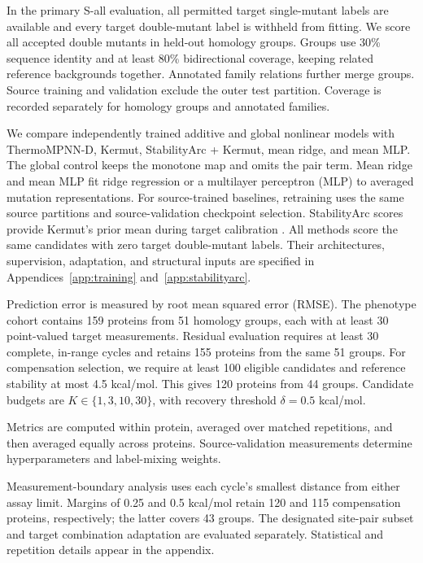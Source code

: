 \documentclass{llncs}
\begin{document}
In the primary S-all evaluation, all permitted target single-mutant labels are available and every target double-mutant label is withheld from fitting. We score all accepted double mutants in held-out homology groups. Groups use 30\% sequence identity and at least 80\% bidirectional coverage, keeping related reference backgrounds together. Annotated family relations further merge groups. Source training and validation exclude the outer test partition. Coverage is recorded separately for homology groups and annotated families.

We compare independently trained additive and global nonlinear models with ThermoMPNN-D, Kermut, StabilityArc + Kermut, mean ridge, and mean MLP. The global control keeps the monotone map and omits the pair term. Mean ridge and mean MLP fit ridge regression or a multilayer perceptron (MLP) to averaged mutation representations. For source-trained baselines, retraining uses the same source partitions and source-validation checkpoint selection. StabilityArc scores provide Kermut's prior mean during target calibration \citep{feller2026,groth2024}. All methods score the same candidates with zero target double-mutant labels. Their architectures, supervision, adaptation, and structural inputs are specified in Appendices~\ref{app:training} and~\ref{app:stabilityarc}.

Prediction error is measured by root mean squared error (RMSE). The phenotype cohort contains 159 proteins from 51 homology groups, each with at least 30 point-valued target measurements. Residual evaluation requires at least 30 complete, in-range cycles and retains 155 proteins from the same 51 groups. For compensation selection, we require at least 100 eligible candidates and reference stability at most 4.5 kcal/mol. This gives 120 proteins from 44 groups. Candidate budgets are $K\in\{1,3,10,30\}$, with recovery threshold $\delta=0.5$ kcal/mol.

Metrics are computed within protein, averaged over matched repetitions, and then averaged equally across proteins. Source-validation measurements determine hyperparameters and label-mixing weights.

Measurement-boundary analysis uses each cycle's smallest distance from either assay limit. Margins of 0.25 and 0.5 kcal/mol retain 120 and 115 compensation proteins, respectively; the latter covers 43 groups. The designated site-pair subset and target combination adaptation are evaluated separately. Statistical and repetition details appear in the appendix.
\end{document}

